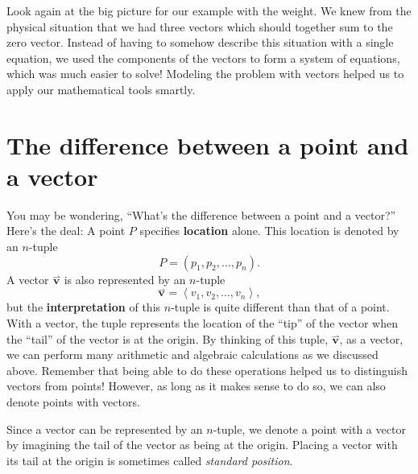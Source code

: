 \documentclass{ximera}
\renewcommand{\vec}[1]{{\overset{\boldsymbol{\rightharpoonup}}{\mathbf{#1}}}}
\renewcommand{\vector}[1]{\left\langle #1\right\rangle}
\begin{document}
Look again at the big picture for our example with the weight. 
We knew from the physical situation that we had three vectors which 
should together sum to the zero vector.  Instead of having to somehow 
describe this situation with a single equation, we used the components 
of the vectors to form a system of equations, which was much easier 
to solve! Modeling the problem with vectors helped us to apply our 
mathematical tools smartly.




\section{The difference between a point and a vector}

You may be wondering, ``What's the difference between a point and a
vector?'' Here's the deal: A point $P$ specifies \textbf{location}
alone. This location is denoted by an $n$-tuple
\[
P=(p_1,p_2,\dots,p_n).
\]
A vector $\vec{v}$ is also represented by an $n$-tuple
\[
\vec{v} = \vector{v_1,v_2,\dots,v_n},
\]
but the \textbf{interpretation} of this $n$-tuple is quite different
than that of a point. With a vector, the tuple represents the location of the
``tip'' of the vector when the ``tail'' of the vector is at the
origin. By thinking of this tuple, $\vec{v}$, as a vector, we can
perform many arithmetic and algebraic calculations as we discussed
above.  Remember that being able to do these operations helped us to 
distinguish vectors from points! However, as long as it makes sense to do so, we can also 
denote points with vectors.
\begin{image}
\end{image}
Since a vector can be represented by an $n$-tuple, we denote a point
with a vector by imagining the tail of the vector as being at the
origin. Placing a vector with its tail at the origin is sometimes
called \textit{standard position}.
\end{document}
